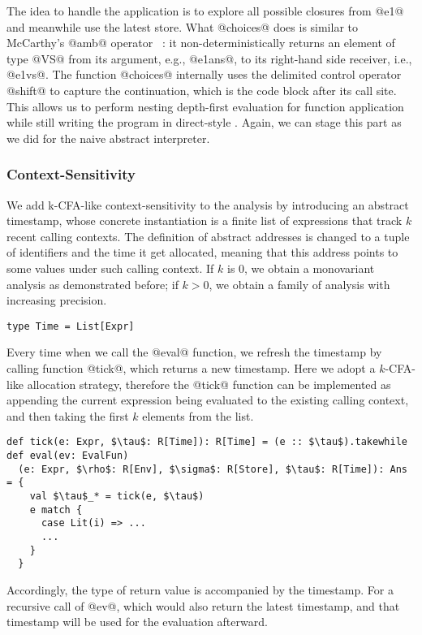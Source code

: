 The idea to handle the application is to explore all possible closures from @e1@ and meanwhile
use the latest store.
What @choices@ does is similar to McCarthy's @amb@ operator ~\cite{MCCARTHY196333}: it non-deterministically returns an
element of type @VS@ from its argument, e.g., @e1ans@, to its right-hand side receiver, i.e., @e1vs@.
The function @choices@ internally uses the delimited control operator @shift@ to capture the continuation,
which is the code block after its call site. 
This allows us to perform nesting depth-first evaluation for function application while still writing 
the program in direct-style \cite{Wei:2018:RAA:3243631.3236800}. 
Again, we can stage this part as we did for the naive abstract interpreter.

\subsubsection{Context-Sensitivity}

We add k-CFA-like context-sensitivity to the analysis by introducing an abstract timestamp, 
whose concrete instantiation is a finite list of expressions that track $k$ recent calling contexts.
The definition of abstract addresses is changed to a tuple of identifiers and the time it get allocated,
meaning that this address points to some values under such calling context.
If $k$ is 0, we obtain a monovariant analysis as demonstrated before; if $k > 0$, we obtain
a family of analysis with increasing precision.

\begin{lstlisting}
type Time = List[Expr]
\end{lstlisting}

Every time when we call the @eval@ function, we refresh the timestamp by calling function @tick@,
which returns a new timestamp. Here we adopt a $k$-CFA-like allocation strategy, therefore
the @tick@ function can be implemented as appending the current expression being evaluated to the existing
calling context, and then taking the first $k$ elements from the list.

\begin{lstlisting}
def tick(e: Expr, $\tau$: R[Time]): R[Time] = (e :: $\tau$).takewhile
def eval(ev: EvalFun)
  (e: Expr, $\rho$: R[Env], $\sigma$: R[Store], $\tau$: R[Time]): Ans = {
    val $\tau$_* = tick(e, $\tau$)
    e match {
      case Lit(i) => ...
      ...
    }
  }
\end{lstlisting}

Accordingly, the type of return value is accompanied by the timestamp. For a recursive call of @ev@,
which would also return the latest timestamp, and that timestamp will be used for the evaluation afterward.

